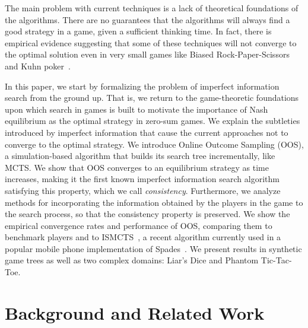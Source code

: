 \documentclass[letterpaper]{article}
\newcounter{vlNoteCounter}
\newcommand{\vlnote}[1]{{\scriptsize \color{blue} $\blacksquare$ \refstepcounter{vlNoteCounter}\textsf{[VL]$_{\arabic{vlNoteCounter}}$:{#1}}}}
\begin{document}

The main problem with current techniques is a lack of theoretical foundations of the algorithms. There are no guarantees that the algorithms will always find a good strategy in a game, given a sufficient thinking time. In fact, there is empirical evidence suggesting that some of these techniques will not converge to the optimal solution even in very small games like Biased Rock-Paper-Scissors and Kuhn poker~\cite{Shafiei09,Ponsen11Computing}.

In this paper, we start by formalizing the problem of imperfect information search from the ground up. That is, we return to the game-theoretic 
foundations upon which search in games is built to motivate the importance of Nash equilibrium as the optimal strategy in zero-sum games. We explain the subtleties introduced by imperfect information that cause the current approaches not to converge to the optimal strategy. We introduce Online Outcome Sampling (OOS), a simulation-based algorithm that builds its search tree incrementally, like MCTS.  
We show that OOS converges to an equilibrium strategy as time increases, making it the first 
known imperfect information search algorithm satisfying this property, which we call {\it consistency}. Furthermore, we analyze methods for incorporating the information obtained by the players in the game to the search process, so that the consistency property is preserved. We show the empirical convergence rates and performance of OOS, comparing them to benchmark players and to ISMCTS~\cite{Cowling12ISMCTS}, a 
recent algorithm currently used in a popular mobile phone implementation of Spades~\cite{Whitehouse13Integrating}. 
We present results in synthetic game trees as well as two complex domains: Liar's Dice and Phantom Tic-Tac-Toe.



\section{Background and Related Work}
\end{document}
